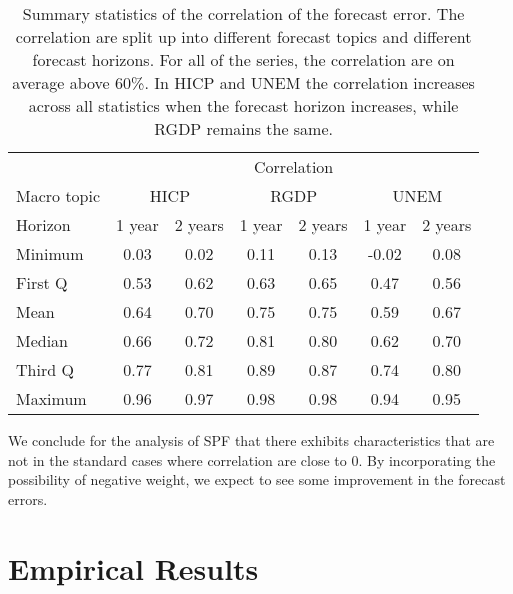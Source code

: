 \documentclass[11pt]{article}
\begin{document}
\begin{table}[!h]
	\centering
	\caption{Summary statistics of the correlation of the forecast error. The correlation are split up into different forecast topics and different forecast horizons. For all of the series, the correlation are on average above 60\%. In HICP and UNEM the correlation increases across all statistics when the forecast horizon increases, while RGDP remains the same.}
	\label{tab: correlation summary statistics}
	\begin{tabular}{lcccccc}%
		\hline
		&\multicolumn{6}{c}{Correlation}\\
		\cmidrule(lr){2-7}
		Macro topic & \multicolumn{2}{c}{HICP} & \multicolumn{2}{c}{RGDP} & \multicolumn{2}{c}{UNEM} \\
		\cmidrule(lr){2-3} \cmidrule(lr){4-5}\cmidrule(lr){6-7}
		Horizon     & 1 year & 2 years & 1 year & 2 years & 1 year & 2 years \\ 
		\hline
		Minimum     & 0.03        & 0.02        & 0.11        & 0.13        & -0.02        & 0.08       \\
		First Q     & 0.53        & 0.62        & 0.63        & 0.65        & 0.47         & 0.56       \\
		Mean        & 0.64        & 0.70        & 0.75        & 0.75        & 0.59         & 0.67       \\
		Median      & 0.66        & 0.72        & 0.81        & 0.80        & 0.62         & 0.70       \\
		Third Q     & 0.77        & 0.81        & 0.89        & 0.87        & 0.74         & 0.80       \\
		Maximum     & 0.96        & 0.97        & 0.98        & 0.98        & 0.94         & 0.95       \\ 
		\hline
	\end{tabular}
\end{table}



We conclude for the analysis of SPF that there exhibits
characteristics that are not in the standard cases where correlation are close to 0. By incorporating the
possibility of negative weight, we expect to see some improvement in the
forecast errors.

\section{Empirical Results}\label{empirical-results}
\end{document}
